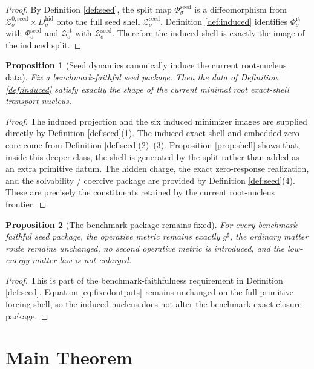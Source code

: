 \documentclass[11pt]{article}
\newcommand{\CompletedMetric}{g^{\sharp}}
\newcommand{\HiddenBody}[1]{D_{#1}^{\mathrm{hid}}}
\newcommand{\SeedShellSet}[1]{\mathcal Z_{#1}^{\mathrm{seed}}}
\newcommand{\SeedZeroCore}[1]{\mathcal Z_{#1}^{0,\mathrm{seed}}}
\newcommand{\SeedSplit}[1]{\Phi_{#1}^{\mathrm{seed}}}
\newcommand{\RootShellSet}[1]{\mathcal Z_{#1}^{\mathrm{rt}}}
\newcommand{\RootSplit}[1]{\Phi_{#1}^{\mathrm{rt}}}
\newtheorem{proposition}{Proposition}
\begin{document}
\begin{proof}
By Definition \ref{def:seed}, the split map \(\SeedSplit{\sigma}\) is a diffeomorphism from \(\SeedZeroCore{\sigma}\times\HiddenBody{\sigma}\) onto the full seed shell \(\SeedShellSet{\sigma}\). Definition \ref{def:induced} identifies \(\RootSplit{\sigma}\) with \(\SeedSplit{\sigma}\) and \(\RootShellSet{\sigma}\) with \(\SeedShellSet{\sigma}\). Therefore the induced shell is exactly the image of the induced split.
\end{proof}

\begin{proposition}[Seed dynamics canonically induce the current root-nucleus data]
\label{prop:induce}
Fix a benchmark-faithful seed package. Then the data of Definition \ref{def:induced} satisfy exactly the shape of the current minimal root exact-shell transport nucleus.
\end{proposition}

\begin{proof}
The induced projection and the six induced minimizer images are supplied directly by Definition \ref{def:seed}(1). The induced exact shell and embedded zero core come from Definition \ref{def:seed}(2)--(3). Proposition \ref{prop:shell} shows that, inside this deeper class, the shell is generated by the split rather than added as an extra primitive datum. The hidden charge, the exact zero-response realization, and the solvability / coercive package are provided by Definition \ref{def:seed}(4). These are precisely the constituents retained by the current root-nucleus frontier.
\end{proof}

\begin{proposition}[The benchmark package remains fixed]
\label{prop:boundary}
For every benchmark-faithful seed package, the operative metric remains exactly \(\CompletedMetric\), the ordinary matter route remains unchanged, no second operative metric is introduced, and the low-energy matter law is not enlarged.
\end{proposition}

\begin{proof}
This is part of the benchmark-faithfulness requirement in Definition \ref{def:seed}. Equation \eqref{eq:fixedoutputs} remains unchanged on the full primitive forcing shell, so the induced nucleus does not alter the benchmark exact-closure package.
\end{proof}

\section{Main Theorem}
\end{document}
